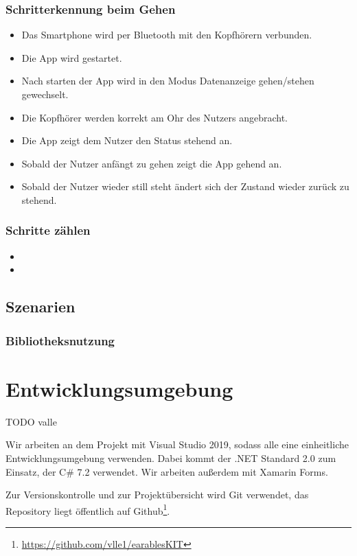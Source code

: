 \documentclass[a4paper,12pt]{article}
\begin{document}
  \subsubsection{Schritterkennung beim Gehen}
  \begin{itemize}
    \item[]Das Smartphone wird per Bluetooth mit den Kopfhörern verbunden.
    \item[]Die App wird gestartet.
    \item[]Nach starten der App wird in den Modus \glqq Datenanzeige gehen/stehen\grqq{} gewechselt.
    \item[]Die Kopfhörer werden korrekt am Ohr des Nutzers angebracht.
    \item[]Die App zeigt dem Nutzer den Status \glqq stehend\grqq{} an.
    \item[]Sobald der Nutzer anfängt zu gehen zeigt die App \glqq gehend\grqq{} an.
    \item[]Sobald der Nutzer wieder still steht ändert sich der Zustand wieder zurück zu \glqq stehend\grqq. 
  \end{itemize}
  \subsubsection{Schritte zählen}
  \begin{itemize}
    \item[]
    \item[] 
  \end{itemize}
  \subsection{Szenarien}
    \subsubsection{Bibliotheksnutzung}


\section{Entwicklungsumgebung}
TODO valle

Wir arbeiten an dem Projekt mit Visual Studio 2019, sodass alle eine einheitliche Entwicklungsumgebung verwenden.
Dabei kommt der .NET Standard 2.0 zum Einsatz, der C\# 7.2 verwendet. Wir arbeiten außerdem mit Xamarin Forms.

Zur Versionskontrolle und zur Projektübersicht wird Git verwendet, das Repository liegt öffentlich auf Github\footnote{\url{https://github.com/vlle1/earablesKIT}}.
\clearpage

\end{document}
